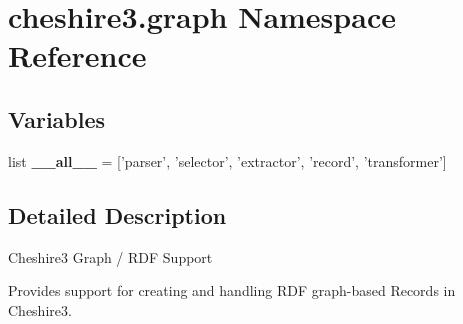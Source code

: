 \hypertarget{namespacecheshire3_1_1graph}{\section{cheshire3.\-graph Namespace Reference}
\label{namespacecheshire3_1_1graph}
}
\subsection*{Variables}
\begin{DoxyCompactItemize}
\item 
\hypertarget{namespacecheshire3_1_1graph_abd3a6498362c1c6fc66ef594c54a8436}{list {\bfseries \-\_\-\-\_\-all\-\_\-\-\_\-} = \mbox{[}'parser', 'selector', 'extractor', 'record', 'transformer'\mbox{]}}\label{namespacecheshire3_1_1graph_abd3a6498362c1c6fc66ef594c54a8436}

\end{DoxyCompactItemize}


\subsection{Detailed Description}
\begin{DoxyVerb}Cheshire3 Graph / RDF Support

Provides support for creating and handling RDF graph-based Records in
Cheshire3.
\end{DoxyVerb}
 